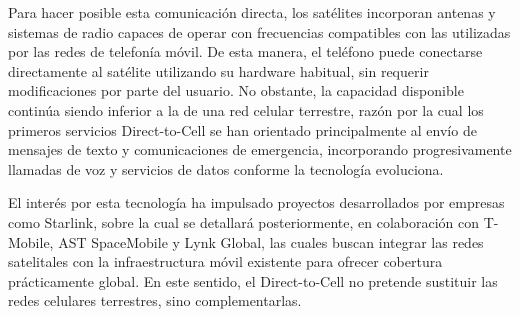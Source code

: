 Para hacer posible esta comunicación directa, los satélites incorporan antenas y sistemas de radio capaces de operar con frecuencias compatibles con las utilizadas por las redes de telefonía móvil. De esta manera, el teléfono puede conectarse directamente al satélite utilizando su hardware habitual, sin requerir modificaciones por parte del usuario. No obstante, la capacidad disponible continúa siendo inferior a la de una red celular terrestre, razón por la cual los primeros servicios Direct-to-Cell se han orientado principalmente al 	envío de mensajes de texto y comunicaciones de emergencia, incorporando progresivamente llamadas de voz y servicios de datos conforme la tecnología evoluciona.

El interés por esta tecnología ha impulsado proyectos desarrollados por empresas como Starlink, sobre la cual se detallará posteriormente, en colaboración con T-Mobile, AST SpaceMobile y Lynk Global, las cuales buscan integrar las redes satelitales con la infraestructura móvil existente para ofrecer cobertura prácticamente global. En este sentido, el Direct-to-Cell no pretende sustituir las redes celulares terrestres, sino complementarlas.

